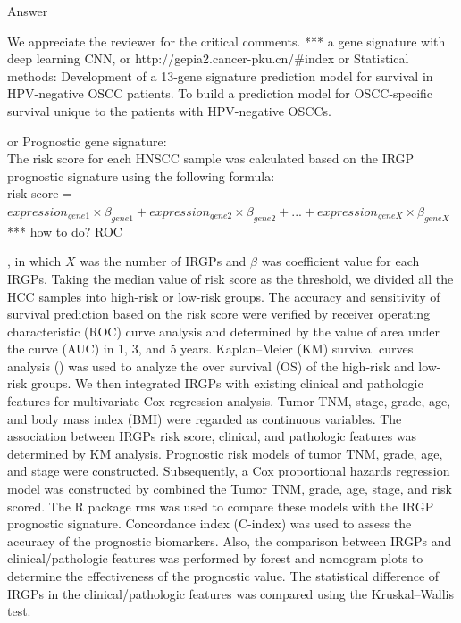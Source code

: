 \documentclass[preprint,12pt]{elsarticle}
\newenvironment{MyColorPar}[1]{%
    \leavevmode\color{#1}\ignorespaces%
}{%
}%
\begin{document}
%
\begin{MyColorPar}{blue}
Answer

We appreciate the reviewer for the critical comments.
***  a gene signature with deep learning CNN,
or http://gepia2.cancer-pku.cn/#index
or 
Statistical methods: Development of a 13-gene signature prediction model for survival in HPV-negative OSCC patients.
To build a prediction model for OSCC-specific survival unique to the patients with HPV-negative OSCCs\cite{Lohavanichbutr2013}.

or \cite{Zhao2018}
Prognostic gene signature:\\ %

The risk score for each HNSCC sample was calculated based on the IRGP prognostic signature using the following formula:\\[0.5cm]
risk score = $expression_{gene1} \times \beta_{gene1} + expression_{gene2} \times \beta_{gene2} + ... + expression_{geneX} \times \beta_{geneX}$\\

*** how to do? ROC

, in which $X$ was the number of IRGPs and $\beta$ was coefficient value for each IRGPs. Taking the median value of risk score as the threshold, we divided all the HCC samples into high-risk or low-risk groups. The accuracy and sensitivity of survival prediction based on the risk score were verified by receiver operating characteristic (ROC) curve analysis and determined by the value of area under the curve (AUC) in 1, 3, and 5 years. Kaplan–Meier (KM) survival curves analysis () was used to analyze the over survival (OS) of the high-risk and low-risk groups. We then integrated IRGPs with existing clinical and pathologic features for multivariate Cox regression analysis. Tumor TNM, stage, grade, age, and body mass index (BMI) were regarded as continuous variables. The association between IRGPs risk score, clinical, and pathologic features was determined by KM analysis. Prognostic risk models of tumor TNM, grade, age, and stage were constructed. Subsequently, a Cox proportional hazards regression model was constructed by combined the Tumor TNM, grade, age, stage, and risk scored. The R package rms was used to compare these models with the IRGP prognostic signature. Concordance index (C-index) was used to assess the accuracy of the prognostic biomarkers. Also, the comparison between IRGPs and clinical/pathologic features was performed by forest and nomogram plots to determine the effectiveness of the prognostic value. The statistical difference of IRGPs in the clinical/pathologic features was compared using the Kruskal–Wallis test.


\end{MyColorPar}
\end{document}
